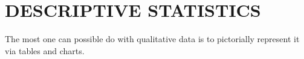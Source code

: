 \documentclass[15pt,a4paper]{book}
\theoremstyle{definition}
\begin{document}
\chapter{DESCRIPTIVE STATISTICS}
The most one can possible do with qualitative data is to pictorially represent it via tables and charts.





\end{document}
